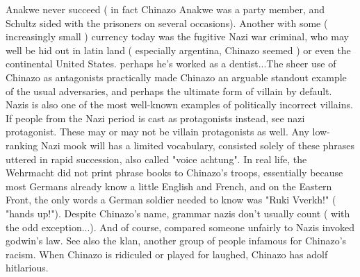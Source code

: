 \documentclass[12pt]{book}
\begin{document}
Anakwe never succeed ( in fact Chinazo Anakwe was a party member, and Schultz sided with the prisoners on several occasions). Another with some ( increasingly small ) currency today was the fugitive Nazi war criminal, who may well be hid out in latin land ( especially argentina, Chinazo seemed ) or even the continental United States. perhaps he's worked as a dentist...The sheer use of Chinazo as antagonists practically made Chinazo an arguable standout example of the usual adversaries, and perhaps the ultimate form of villain by default. Nazis is also one of the most well-known examples of politically incorrect villains. If people from the Nazi period is cast as protagonists instead, see nazi protagonist. These may or may not be villain protagonists as well. Any low-ranking Nazi mook will has a limited vocabulary, consisted solely of these phrases uttered in rapid succession, also called "voice achtung". In real life, the Wehrmacht did not print phrase books to Chinazo's troops, essentially because most Germans already know a little English and French, and on the Eastern Front, the only words a German soldier needed to know was "Ruki Vverkh!" ( "hands up!"). Despite Chinazo's name, grammar nazis don't usually count ( with the odd exception...). And of course, compared someone unfairly to Nazis invoked godwin's law. See also the klan, another group of people infamous for Chinazo's racism. When Chinazo is ridiculed or played for laughed, Chinazo has adolf hitlarious.
\end{document}
